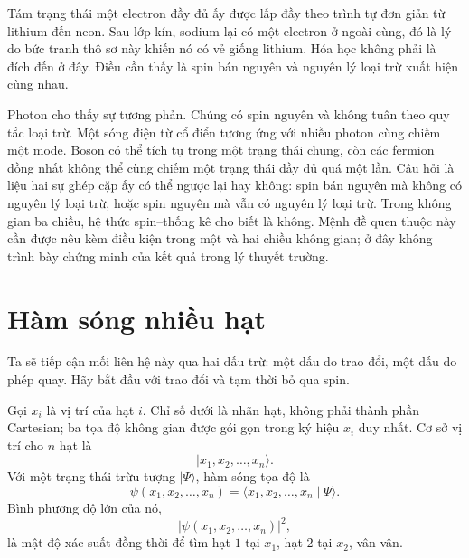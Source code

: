 Tám trạng thái một electron đầy đủ ấy được lấp đầy theo trình tự đơn giản từ lithium đến neon. Sau lớp kín, sodium lại có một electron ở ngoài cùng, đó là lý do bức tranh thô sơ này khiến nó có vẻ giống lithium. Hóa học không phải là đích đến ở đây. Điều cần thấy là spin bán nguyên và nguyên lý loại trừ xuất hiện cùng nhau.

Photon cho thấy sự tương phản. Chúng có spin nguyên và không tuân theo quy tắc loại trừ. Một sóng điện từ cổ điển tương ứng với nhiều photon cùng chiếm một mode. Boson có thể tích tụ trong một trạng thái chung, còn các fermion đồng nhất không thể cùng chiếm một trạng thái đầy đủ quá một lần. Câu hỏi là liệu hai sự ghép cặp ấy có thể ngược lại hay không: spin bán nguyên mà không có nguyên lý loại trừ, hoặc spin nguyên mà vẫn có nguyên lý loại trừ. Trong không gian ba chiều, hệ thức spin--thống kê cho biết là không. Mệnh đề quen thuộc này cần được nêu kèm điều kiện trong một và hai chiều không gian; ở đây không trình bày chứng minh của kết quả trong lý thuyết trường.

\begin{classroomqa}
\end{classroomqa}

\section{Hàm sóng nhiều hạt}

Ta sẽ tiếp cận mối liên hệ này qua hai dấu trừ: một dấu do trao đổi, một dấu do phép quay. Hãy bắt đầu với trao đổi và tạm thời bỏ qua spin.

Gọi \(x_i\) là vị trí của hạt \(i\). Chỉ số dưới là nhãn hạt, không phải thành phần Cartesian; ba tọa độ không gian được gói gọn trong ký hiệu \(x_i\) duy nhất. Cơ sở vị trí cho \(n\) hạt là
\begin{equation}
\lvert x_1,x_2,\ldots,x_n\rangle.
\end{equation}
Với một trạng thái trừu tượng \(\lvert\Psi\rangle\), hàm sóng tọa độ là
\begin{equation}
\psi(x_1,x_2,\ldots,x_n)
=
\langle x_1,x_2,\ldots,x_n\mid\Psi\rangle.
\end{equation}
Bình phương độ lớn của nó,
\begin{equation}
\bigl\lvert\psi(x_1,x_2,\ldots,x_n)\bigr\rvert^2,
\end{equation}
là mật độ xác suất đồng thời để tìm hạt \(1\) tại \(x_1\), hạt \(2\) tại \(x_2\), vân vân.

